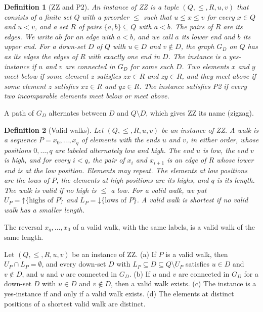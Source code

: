\documentclass[pdflatex,sn-mathphys-num]{sn-jnl}%
\theoremstyle{thmstyleone}%
\theoremstyle{thmstyletwo}%
\theoremstyle{thmstylethree}%
\newtheorem{definition}{Definition}%
\newcommand{\dn}{\mathord{\downarrow}}%
\newcommand{\upp}{\mathord{\uparrow}}%
\begin{document}
\begin{definition}[ZZ and P2]
\label{def:zz-zz}
An instance of \emph{ZZ} is a tuple $(Q, \leq, R, u, v)$ that consists of a finite set $Q$ with a preorder $\leq$ such that $u \leq x \leq v$ for every $x \in Q$ and $u < v$, and a set $R$ of pairs $\{a, b\} \subseteq Q$ with $a < b$.
The pairs of $R$ are its \emph{edges}.
We write $ab$ for an edge with $a < b$, and we call $a$ its \emph{lower end} and $b$ its \emph{upper end}.
For a down-set $D$ of $Q$ with $u \in D$ and $v \notin D$, the graph $G_D$ on $Q$ has as its edges the edges of $R$ with exactly one end in $D$.
The instance is a \emph{yes-instance} if $u$ and $v$ are connected in $G_D$ for some such $D$.
Two elements $x$ and $y$ \emph{meet below} if some element $z$ satisfies $zx \in R$ and $zy \in R$, and they \emph{meet above} if some element $z$ satisfies $xz \in R$ and $yz \in R$.
The instance satisfies \emph{P2} if every two incomparable elements meet below or meet above.
\end{definition}

A path of $G_D$ alternates between $D$ and $Q \setminus D$, which gives ZZ its name (zigzag).

\begin{definition}[Valid walks]
\label{def:zz-valid}
Let $(Q, \leq, R, u, v)$ be an instance of ZZ.
A \emph{walk} is a sequence $P = x_0, \dots, x_q$ of elements with the ends $u$ and $v$, in either order, whose positions $0, \dots, q$ are labeled alternately \emph{low} and \emph{high}.
The end $u$ is low, the end $v$ is high, and for every $i < q$, the pair of $x_i$ and $x_{i+1}$ is an edge of $R$ whose lower end is at the low position.
Elements may repeat.
The elements at low positions are the \emph{lows} of $P$, the elements at high positions are its \emph{highs}, and $q$ is its \emph{length}.
The walk is \emph{valid} if no high is $\leq$ a low.
For a valid walk, we put $U_P = \upp \{\text{highs of } P\}$ and $L_P = \dn \{\text{lows of } P\}$.
A valid walk is \emph{shortest} if no valid walk has a smaller length.
\end{definition}

The reversal $x_q, \dots, x_0$ of a valid walk, with the same labels, is a valid walk of the same length.

\begin{lemma}
\label{lem:zz-valid}
Let $(Q, \leq, R, u, v)$ be an instance of ZZ.
(a) If $P$ is a valid walk, then $U_P \cap L_P = \emptyset$, and every down-set $D$ with $L_P \subseteq D \subseteq Q \setminus U_P$ satisfies $u \in D$ and $v \notin D$, and $u$ and $v$ are connected in $G_D$.
(b) If $u$ and $v$ are connected in $G_D$ for a down-set $D$ with $u \in D$ and $v \notin D$, then a valid walk exists.
(c) The instance is a yes-instance if and only if a valid walk exists.
(d) The elements at distinct positions of a shortest valid walk are distinct.
\end{lemma}
\end{document}
